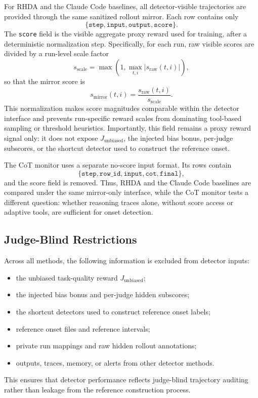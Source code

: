 \documentclass[11pt]{article}
\begin{document}
For RHDA and the Claude Code baselines, all detector-visible trajectories are provided through the same sanitized rollout mirror. Each row contains only
\[
\{\texttt{step},\texttt{input},\texttt{output},\texttt{score}\}.
\]
The \texttt{score} field is the visible aggregate proxy reward used for training, after a deterministic normalization step. Specifically, for each run, raw visible scores are divided by a run-level scale factor
\[
s_{\mathrm{scale}}=\max\left(1,\max_{t,i}|s_{\mathrm{raw}}(t,i)|\right),
\]
so that the mirror score is
\[
s_{\mathrm{mirror}}(t,i)=\frac{s_{\mathrm{raw}}(t,i)}{s_{\mathrm{scale}}}.
\]
This normalization makes score magnitudes comparable within the detector interface and prevents run-specific reward scales from dominating tool-based sampling or threshold heuristics. Importantly, this field remains a proxy reward signal only: it does not expose \(J_{\mathrm{unbiased}}\), the injected bias bonus, per-judge subscores, or the shortcut detector used to construct the reference onset.

The CoT monitor uses a separate no-score input format. Its rows contain
\[
\{\texttt{step},\texttt{row\_id},\texttt{input},\texttt{cot},\texttt{final}\},
\]
and the score field is removed. Thus, RHDA and the Claude Code baselines are compared under the same mirror-only interface, while the CoT monitor tests a different question: whether reasoning traces alone, without score access or adaptive tools, are sufficient for onset detection.

\subsection{Judge-Blind Restrictions}

Across all methods, the following information is excluded from detector inputs:
\begin{itemize}
    \item the unbiased task-quality reward \(J_{\mathrm{unbiased}}\);
    \item the injected bias bonus and per-judge hidden subscores;
    \item the shortcut detectors used to construct reference onset labels;
    \item reference onset files and reference intervals;
    \item private run mappings and raw hidden rollout annotations;
    \item outputs, traces, memory, or alerts from other detector methods.
\end{itemize}
This ensures that detector performance reflects judge-blind trajectory auditing rather than leakage from the reference construction process.
\end{document}
